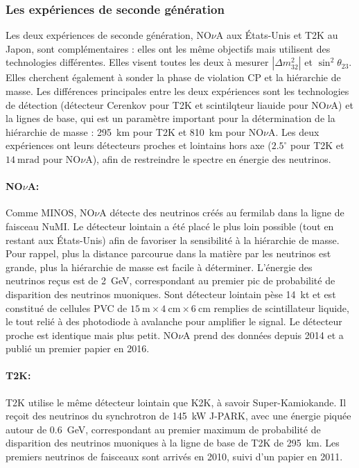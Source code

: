             \subsubsection{Les expériences de seconde génération}
            
            Les deux expériences de seconde génération, NO$\nu$A aux États-Unis et T2K au Japon, sont complémentaires : elles ont les même objectifs mais utilisent des technologies différentes.  Elles visent toutes les deux à mesurer $|\Delta m_{32}^2|$ et $\sin^2{\theta_{23}}$. Elles cherchent également à sonder la phase de violation CP et la hiérarchie de masse. Les différences principales entre les deux expériences sont les technologies de détection (détecteur Cerenkov pour T2K et scintilqteur liauide pour NO$\nu$A) et la lignes de base, qui est un paramètre important pour la détermination de la hiérarchie de masse : \SI{295}{\kilo\meter} pour T2K et \SI{810}{\kilo\meter} pour NO$\nu$A. Les deux expériences ont leurs détecteurs proches et lointains hors axe ($2.5^{\circ}$ pour T2K et $\SI{14}{\milli\radian}$ pour NO$\nu$A), afin de restreindre le spectre en énergie des neutrinos.
            
            \paragraph{NO$\nu$A\cite{nova}:} Comme MINOS, NO$\nu$A détecte des neutrinos créés au fermilab dans la ligne de faisceau NuMI. Le détecteur lointain a été placé le plus loin possible (tout en restant aux États-Unis) afin de favoriser la sensibilité à la hiérarchie de masse. Pour rappel, plus la distance parcourue dans la matière par les neutrinos est grande, plus la hiérarchie de masse est facile à déterminer. L'énergie des neutrinos reçus est de \SI{2}{\giga\electronvolt}, correspondant au premier pic de probabilité de disparition des neutrinos muoniques. Sont détecteur lointain pèse \SI{14}{\kilo\tonne} et est constitué de  cellules PVC de $\SI{15}{\meter}\times\SI{4}{\centi\meter}\times\SI{6}{\centi\meter}$ remplies de scintillateur liquide, le tout relié à des photodiode à avalanche pour amplifier le signal. Le détecteur proche est identique mais plus petit. NO$\nu$A prend des données depuis 2014 et a publié un premier papier en 2016\cite{Adamson2016}.
            
            \paragraph{T2K\cite{T2K}:} T2K utilise le même détecteur lointain que K2K, à savoir Super-Kamiokande. Il reçoit des neutrinos du synchrotron de \SI{145}{\kilo\watt} J-PARK, avec une énergie piquée autour de \SI{0.6}{\giga\electronvolt}, correspondant au premier maximum de probabilité de disparition des neutrinos muoniques à la ligne de base de T2K de \SI{295}{\kilo\meter}. Les premiers neutrinos de faisceaux sont arrivés en 2010, suivi d'un papier en 2011\cite{Abe2011}.
            

